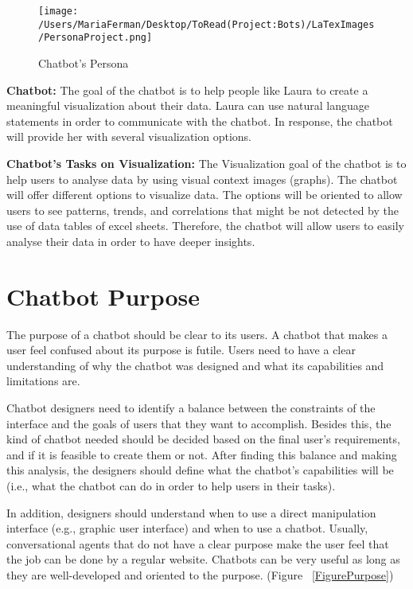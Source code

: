 \documentclass[a4paper,10pt]{article}
\begin{document}
\begin{figure}
\centering
\texttt{[image: /Users/MariaFerman/Desktop/ToRead(Project:Bots)/LaTexImages/PersonaProject.png]}
\caption{Chatbot's Persona}
\label{FigureLaura}
\end{figure}

\textbf{Chatbot:} The goal of the chatbot is to help people like Laura to create a meaningful visualization about their data. Laura can use natural language statements in order to communicate with the chatbot. In response, the chatbot will provide her with several visualization options.

\textbf{Chatbot's Tasks on Visualization:} The Visualization goal of the chatbot is to help users to analyse data by using visual context images (graphs). The chatbot will offer different options to visualize data. The options will be oriented to allow users to see patterns, trends, and correlations that might be not detected by the use of data tables of excel sheets. Therefore, the chatbot will allow users to easily analyse their data in order to have deeper insights.  

\section{Chatbot Purpose}

The purpose of a chatbot should be clear to its users. A chatbot that makes a user feel confused about its purpose is futile. Users need to have a clear understanding of why the chatbot was designed and what its capabilities and limitations are.

Chatbot designers need to identify a balance between the constraints of the interface and the goals of users that they want to accomplish. Besides this, the kind of chatbot needed should be decided based on the final user's requirements, and if it is feasible to create them or not. After finding this balance and making this analysis, the designers should define what the chatbot's capabilities will be (i.e., what the chatbot can do in order to help users in their tasks). 

In addition, designers should understand when to use a direct manipulation interface (e.g., graphic user interface) and when to use a chatbot. Usually, conversational agents that do not have a clear purpose make the user feel that the job can be done by a regular website. Chatbots can be very useful as long as they are well-developed and oriented to the purpose.  
(Figure ~\ref{FigurePurpose})
\end{document}

